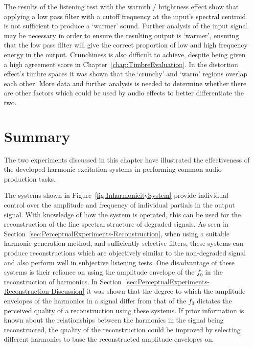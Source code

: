 		The results of the listening test with the warmth / brightness effect show that applying a low pass filter
		with a cutoff frequency at the input's spectral centroid is not sufficient to produce a `warmer' sound.
		Further analysis of the input signal may be necessary in order to ensure the resulting output is `warmer',
		ensuring that the low pass filter will give the correct proportion of low and high frequency energy in the
		output. Crunchiness is also difficult to achieve, despite being given a high agreement score in
		Chapter~\ref{chap:TimbreEvaluation}. In the distortion effect's timbre spaces it was shown that the
		`crunchy' and `warm' regions overlap each other. More data and further analysis is needed to determine
		whether there are other factors which could be used by audio effects to better differentiate the two.

\section{Summary}
\label{sec:PerceptualExperiments-Summary}
	The two experiments discussed in this chapter have illustrated the effectiveness of the developed harmonic
	excitation systems in performing common audio production tasks. 
	
	The systems shown in Figure~\ref{fig:InharmonicitySystem} provide individual control over the amplitude and
	frequency of individual partials in the output signal. With knowledge of how the system is operated, this can be
	used for the reconstruction of the fine spectral structure of degraded signals. As seen in
	Section~\ref{sec:PerceptualExperiments-Reconstruction}, when using a suitable harmonic generation method, and
	sufficiently selective filters, these systems can produce reconstructions which are objectively similar to the
	non-degraded signal and also perform well in subjective listening tests. One disadvantage of these systems is their
	reliance on using the amplitude envelope of the $f_{0}$ in the reconstruction of harmonics. In
	Section~\ref{sec:PerceptualExperiments-Reconstruction-Discussion} it was shown that the degree to which the
	amplitude envelopes of the harmonics in a signal differ from that of the $f_{0}$ dictates the perceived quality of
	a reconstruction using these systems. If prior information is known about the relationships between the harmonics
	in the signal being reconstructed, the quality of the reconstruction could be improved by selecting different
	harmonics to base the reconstructed amplitude envelopes on.

